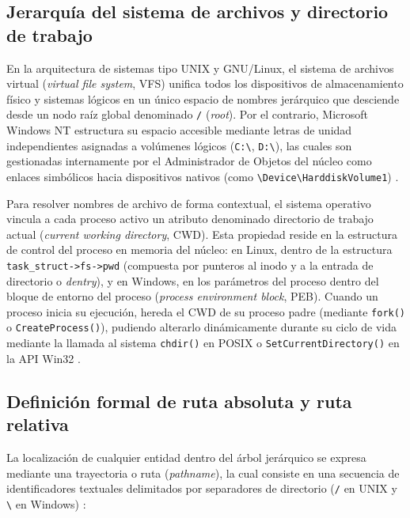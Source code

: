 \documentclass[12pt]{article}
\begin{document}
\subsection{Jerarquía del sistema de archivos y directorio de trabajo}
\label{subsec:jerarquiaDirectorioTrabajo}

En la arquitectura de sistemas tipo UNIX y GNU/Linux, el sistema de archivos virtual (\textit{virtual file system}, VFS) unifica todos los dispositivos de almacenamiento físico y sistemas lógicos en un único espacio de nombres jerárquico que desciende desde un nodo raíz global denominado \texttt{/} (\textit{root}). Por el contrario, Microsoft Windows NT estructura su espacio accesible mediante letras de unidad independientes asignadas a volúmenes lógicos (\texttt{C:\textbackslash}, \texttt{D:\textbackslash}), las cuales son gestionadas internamente por el Administrador de Objetos del núcleo como enlaces simbólicos hacia dispositivos nativos (como \texttt{\textbackslash Device\textbackslash HarddiskVolume1}) \parencite[\S 21.6, p.\ 1058]{deitel2004operating}.

Para resolver nombres de archivo de forma contextual, el sistema operativo vincula a cada proceso activo un atributo denominado directorio de trabajo actual (\textit{current working directory}, CWD). Esta propiedad reside en la estructura de control del proceso en memoria del núcleo: en Linux, dentro de la estructura \texttt{task\_struct->fs->pwd} (compuesta por punteros al inodo y a la entrada de directorio o \textit{dentry}), y en Windows, en los parámetros del proceso dentro del bloque de entorno del proceso (\textit{process environment block}, PEB). Cuando un proceso inicia su ejecución, hereda el CWD de su proceso padre (mediante \texttt{fork()} o \texttt{CreateProcess()}), pudiendo alterarlo dinámicamente durante su ciclo de vida mediante la llamada al sistema \texttt{chdir()} en POSIX o \texttt{SetCurrentDirectory()} en la API Win32 \parencite[\S 6.3, p.\ 309]{carretero2001sistemas}.

\subsection{Definición formal de ruta absoluta y ruta relativa}
\label{subsec:definicionRutasAbsolutaRelativa}

La localización de cualquier entidad dentro del árbol jerárquico se expresa mediante una trayectoria o ruta (\textit{pathname}), la cual consiste en una secuencia de identificadores textuales delimitados por separadores de directorio (\texttt{/} en UNIX y \texttt{\textbackslash} en Windows) \parencite[\S 10.3, p.\ 342]{silberschatz2006fundamentos}:
\end{document}
